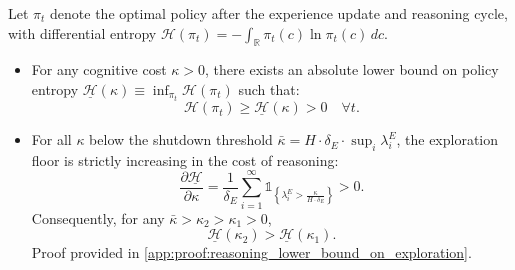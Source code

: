 
\begin{proposition}
\label{prop:reasoning_lower_bound_on_exploration}
Let $\pi_t$ denote the optimal policy after the experience update and reasoning cycle, with differential entropy $\mathcal{H}(\pi_t) = -\int_{\mathbb{R}} \pi_t(c) \ln \pi_t(c) \, dc$.
    
\begin{itemize}
    \item[i)] For any cognitive cost $\kappa > 0$, there exists an absolute lower bound on policy entropy $\underline{\mathcal{H}}(\kappa) \equiv \inf_{\pi_t} \mathcal{H}(\pi_t)$ such that:
    \begin{equation}
    \mathcal{H}(\pi_t) \geq \underline{\mathcal{H}}(\kappa) > 0 \quad \forall t.
    \end{equation}
    
    \item[ii)] For all $\kappa$ below the shutdown threshold $\bar{\kappa} = H \cdot \delta_E \cdot \sup_i \lambda_i^E$, the exploration floor is strictly increasing in the cost of reasoning:
    \begin{equation}
    \frac{\partial \underline{\mathcal{H}}}{\partial \kappa} = \frac{1}{\delta_E} \sum_{i=1}^{\infty} \mathbb{1}_{\left\{\lambda_i^E > \frac{\kappa}{H \cdot \delta_E}\right\}} > 0.
    \end{equation}
        Consequently, for any $\bar{\kappa} > \kappa_2 > \kappa_1 > 0$,
    \begin{equation}
    \underline{\mathcal{H}}(\kappa_2) > \underline{\mathcal{H}}(\kappa_1).
    \end{equation}
    Proof provided in \ref{app:proof:reasoning_lower_bound_on_exploration}.
\end{itemize}
\end{proposition}



